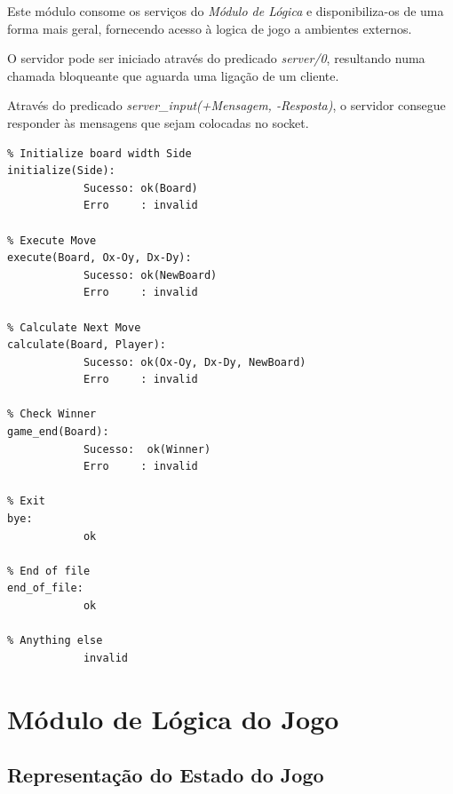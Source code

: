 \documentclass[15pt,a4paper]{article}
\begin{document}
Este módulo consome os serviços do \textit{Módulo de Lógica} e disponibiliza-os de uma forma mais geral, fornecendo acesso à logica de jogo a ambientes externos.

O servidor pode ser iniciado através do predicado \textit{server/0}, resultando numa chamada bloqueante que aguarda uma ligação de um cliente.

Através do predicado \textit{server\_input(+Mensagem, -Resposta)}, o servidor consegue responder às mensagens que sejam colocadas no socket.

\begin{lstlisting}
% Initialize board width Side
initialize(Side):
			Sucesso: ok(Board)
			Erro	 : invalid

% Execute Move
execute(Board, Ox-Oy, Dx-Dy):
			Sucesso: ok(NewBoard)
			Erro	 : invalid

% Calculate Next Move
calculate(Board, Player):
			Sucesso: ok(Ox-Oy, Dx-Dy, NewBoard)
			Erro	 : invalid

% Check Winner
game_end(Board):
			Sucesso:  ok(Winner)
			Erro	 : invalid
 
% Exit
bye:
			ok

% End of file
end_of_file:
			ok

% Anything else
			invalid
\end{lstlisting}


\newpage

\section{Módulo de Lógica do Jogo}




\subsection{Representação do Estado do Jogo}
\end{document}
